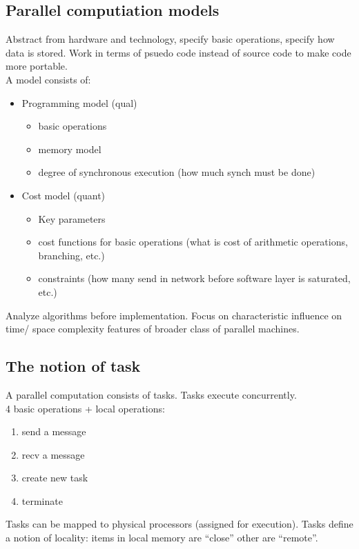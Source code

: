 \documentclass[a4paper]{article}
\begin{document}
\subsection{Parallel computiation models}
Abstract from hardware and technology, specify basic operations, specify
how data is stored. Work in terms of psuedo code instead of source code
to make code more portable.\\
A model consists of:
\begin{itemize}
    \item Programming model (qual)
        \begin{itemize}
            \item basic operations
            \item memory model
            \item degree of synchronous execution (how much synch must be done)
        \end{itemize}
    \item Cost model (quant)
        \begin{itemize}
            \item Key parameters
            \item cost functions for basic operations (what is cost of arithmetic
                operations, branching, etc.)
            \item constraints (how many send in network before software layer
                is saturated, etc.)
        \end{itemize}
\end{itemize}
Analyze algorithms before implementation. Focus on characteristic influence on time/
space complexity features of broader class of parallel machines.

\subsection{The notion of task}
A parallel computation consists of tasks. Tasks execute concurrently.\\
4 basic operations + local operations:
\begin{enumerate}
    \item send a message
    \item recv a message
    \item create new task
    \item terminate
\end{enumerate}
Tasks can be mapped to physical processors (assigned for execution). Tasks
define a notion of locality: items in local memory are ``close'' other are
``remote''.
\end{document}
